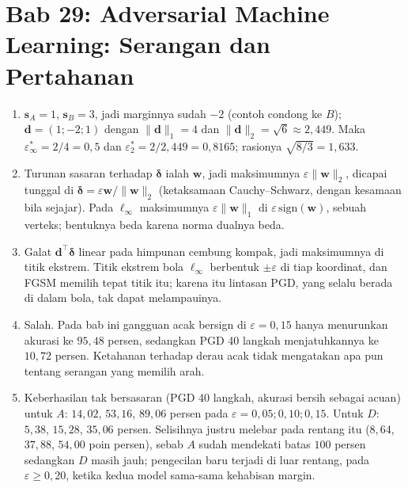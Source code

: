 \section*{Bab 29: Adversarial Machine Learning: Serangan dan Pertahanan}
\begin{enumerate}[label=\textbf{29.\arabic*}]
  \item $\mathbf{s}_{A}=1$, $\mathbf{s}_{B}=3$, jadi marginnya sudah $-2$ (contoh
        condong ke $B$); $\mathbf{d}=(1;-2;1)$ dengan $\lVert\mathbf{d}\rVert_{1}=4$
        dan $\lVert\mathbf{d}\rVert_{2}=\sqrt6\approx2{,}449$. Maka
        $\varepsilon^{*}_{\infty}=2/4=0{,}5$ dan
        $\varepsilon^{*}_{2}=2/2{,}449=0{,}8165$; rasionya $\sqrt{8/3}=1{,}633$.

  \item Turunan sasaran terhadap $\boldsymbol{\delta}$ ialah $\mathbf{w}$, jadi
        maksimumnya $\varepsilon\lVert\mathbf{w}\rVert_{2}$, dicapai tunggal di
        $\boldsymbol{\delta}=\varepsilon\mathbf{w}/\lVert\mathbf{w}\rVert_{2}$
        (ketaksamaan Cauchy--Schwarz, dengan kesamaan bila sejajar). Pada
        $\ell_\infty$ maksimumnya $\varepsilon\lVert\mathbf{w}\rVert_{1}$ di
        $\varepsilon\,\mathrm{sign}(\mathbf{w})$, sebuah verteks; bentuknya beda
        karena norma dualnya beda.

  \item Galat $\mathbf{d}^{\top}\boldsymbol{\delta}$ linear pada himpunan cembung
        kompak, jadi maksimumnya di titik ekstrem. Titik ekstrem bola
        $\ell_\infty$ berbentuk $\pm\varepsilon$ di tiap koordinat, dan FGSM memilih
        tepat titik itu; karena itu lintasan PGD, yang selalu berada di dalam bola,
        tak dapat melampauinya.

  \item Salah. Pada bab ini gangguan acak bersign di $\varepsilon=0{,}15$ hanya
        menurunkan akurasi ke $95{,}48$ persen, sedangkan PGD 40 langkah
        menjatuhkannya ke $10{,}72$ persen. Ketahanan terhadap derau acak tidak
        mengatakan apa pun tentang serangan yang memilih arah.

  \item 
Keberhasilan tak bersasaran (PGD 40 langkah, akurasi bersih sebagai acuan)
        untuk $A$: $14{,}02$, $53{,}16$, $89{,}06$ persen pada $\varepsilon=
        0{,}05;0{,}10;0{,}15$. Untuk $D$: $5{,}38$, $15{,}28$, $35{,}06$ persen.
        Selisihnya justru melebar pada rentang itu ($8{,}64$, $37{,}88$, $54{,}00$
        poin persen), sebab $A$ sudah mendekati batas $100$ persen sedangkan $D$
        masih jauh; pengecilan baru terjadi di luar rentang, pada
        $\varepsilon\ge0{,}20$, ketika kedua model sama-sama kehabisan margin.


\end{enumerate}
